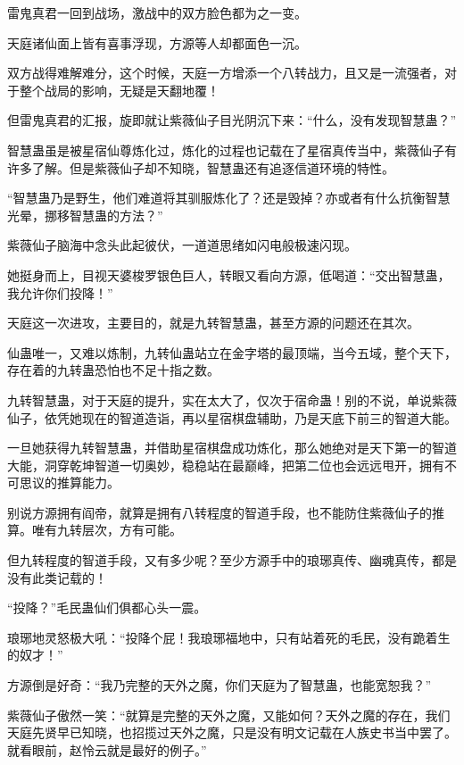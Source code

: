 
\begin{this_body}

雷鬼真君一回到战场，激战中的双方脸色都为之一变。

天庭诸仙面上皆有喜事浮现，方源等人却都面色一沉。

双方战得难解难分，这个时候，天庭一方增添一个八转战力，且又是一流强者，对于整个战局的影响，无疑是天翻地覆！

但雷鬼真君的汇报，旋即就让紫薇仙子目光阴沉下来：“什么，没有发现智慧蛊？”

智慧蛊虽是被星宿仙尊炼化过，炼化的过程也记载在了星宿真传当中，紫薇仙子有许多了解。但是紫薇仙子却不知晓，智慧蛊还有追逐信道环境的特性。

“智慧蛊乃是野生，他们难道将其驯服炼化了？还是毁掉？亦或者有什么抗衡智慧光晕，挪移智慧蛊的方法？”

紫薇仙子脑海中念头此起彼伏，一道道思绪如闪电般极速闪现。

她挺身而上，目视天婆梭罗银色巨人，转眼又看向方源，低喝道：“交出智慧蛊，我允许你们投降！”

天庭这一次进攻，主要目的，就是九转智慧蛊，甚至方源的问题还在其次。

仙蛊唯一，又难以炼制，九转仙蛊站立在金字塔的最顶端，当今五域，整个天下，存在着的九转蛊恐怕也不足十指之数。

九转智慧蛊，对于天庭的提升，实在太大了，仅次于宿命蛊！别的不说，单说紫薇仙子，依凭她现在的智道造诣，再以星宿棋盘辅助，乃是天底下前三的智道大能。

一旦她获得九转智慧蛊，并借助星宿棋盘成功炼化，那么她绝对是天下第一的智道大能，洞穿乾坤智道一切奥妙，稳稳站在最巅峰，把第二位也会远远甩开，拥有不可思议的推算能力。

别说方源拥有阎帝，就算是拥有八转程度的智道手段，也不能防住紫薇仙子的推算。唯有九转层次，方有可能。

但九转程度的智道手段，又有多少呢？至少方源手中的琅琊真传、幽魂真传，都是没有此类记载的！

“投降？”毛民蛊仙们俱都心头一震。

琅琊地灵怒极大吼：“投降个屁！我琅琊福地中，只有站着死的毛民，没有跪着生的奴才！”

方源倒是好奇：“我乃完整的天外之魔，你们天庭为了智慧蛊，也能宽恕我？”

紫薇仙子傲然一笑：“就算是完整的天外之魔，又能如何？天外之魔的存在，我们天庭先贤早已知晓，也招揽过天外之魔，只是没有明文记载在人族史书当中罢了。就看眼前，赵怜云就是最好的例子。”


\end{this_body}
